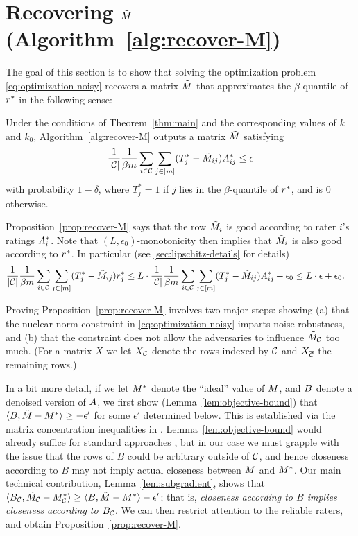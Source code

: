 \section{Recovering $\tilde{M}$ (Algorithm~\ref{alg:recover-M})}
\label{sec:approach-M}

The goal of this section is to show that solving the optimization 
problem \eqref{eq:optimization-noisy} recovers a matrix $\tilde{M}$ that 
approximates the $\beta$-quantile of $r^*$ in the following sense:
\begin{proposition}
\label{prop:recover-M}
Under the conditions of Theorem~\ref{thm:main} and the corresponding values of $k$ and $k_0$, Algorithm~\ref{alg:recover-M} 
outputs a matrix $\tilde{M}$ satisfying 
\[ \frac{1}{|\mathcal{C}|} \frac{1}{\beta m} \sum_{i \in \mathcal{C}} \sum_{j \in [m]} (T^*_j - \tilde{M}_{ij})A^*_{ij} \leq \epsilon \]
with probability $1-\delta$, where $T^*_j = 1$ if $j$ lies in the $\beta$-quantile of $r^*$, and is $0$ otherwise.
\end{proposition}
Proposition~\ref{prop:recover-M} says that the row $\tilde{M}_i$ 
is good according to rater $i$'s ratings $A^*_i$. Note that
$(L,\epsilon_0)$-monotonicity 
then implies that $\tilde{M}_i$ is also good according to $r^*$.
In particular (see \ref{sec:lipschitz-details} for details)
\begin{align}
\label{eq:lipschitz-usage}
\frac{1}{|\mathcal{C}|}\frac{1}{\beta m}\sum_{i \in \mathcal{C}}\sum_{j \in [m]} (T_j^*-\tilde{M}_{ij})r^*_j
&\leq L \cdot \frac{1}{|\mathcal{C}|}\frac{1}{\beta m}\sum_{i \in \mathcal{C}}\sum_{j \in [m]} (T_j^*-\tilde{M}_{ij})A^*_{ij} + \epsilon_0 
\leq L \cdot \epsilon + \epsilon_0.
\end{align}

Proving Proposition~\ref{prop:recover-M} involves two major steps: showing 
(a) that the nuclear norm constraint in \eqref{eq:optimization-noisy} 
imparts noise-robustness, and (b) that the constraint does not allow 
the adversaries to influence $\tilde{M}_{\mathcal{C}}$ too much. (For a matrix $X$ 
we let $X_{\mathcal{C}}$ denote the rows indexed by $\mathcal{C}$ and $X_{\overline{\mathcal{C}}}$ the remaining rows.)

In a bit 
more detail, if we let $M^*$ denote the ``ideal'' value of $\tilde{M}$, and $B$ 
denote a denoised version of $\tilde{A}$, we first show 
(Lemma~\ref{lem:objective-bound}) that 
$\langle B, \tilde{M} - M^* \rangle \geq -\epsilon'$ for some $\epsilon'$ 
determined below. This is established via the matrix concentration 
inequalities in . Lemma~\ref{lem:objective-bound} 
would already suffice for standard approaches \citep[e.g.,][]{guedon2014community}, 
but in our case we must grapple with the issue that the rows of $B$ could be 
arbitrary outside of $\mathcal{C}$, and hence closeness according to $B$ may not 
imply actual closeness between $\tilde{M}$ and $M^*$. Our main 
technical contribution, Lemma~\ref{lem:subgradient}, shows
that $\langle B_{\mathcal{C}}, \tilde{M}_{\mathcal{C}} - M^*_{\mathcal{C}} \rangle \geq \langle B, \tilde{M} - M^* \rangle - \epsilon'$; 
that is, \emph{closeness according to $B$ implies closeness according to 
$B_{\mathcal{C}}$}. We can then restrict attention to the 
reliable raters, and obtain Proposition~\ref{prop:recover-M}.

